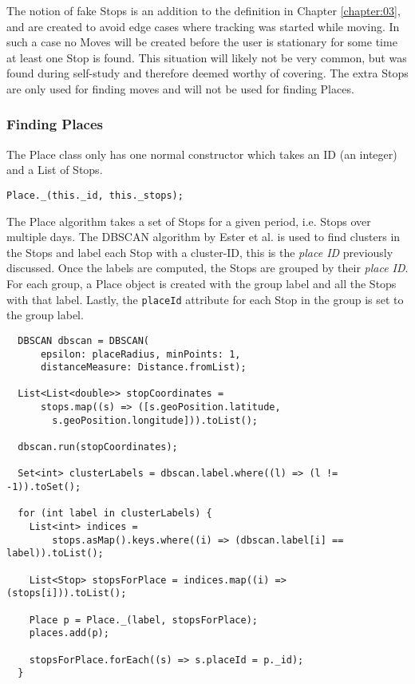 The notion of fake Stops is an addition to the definition in Chapter \ref{chapter:03}, and are created to avoid edge cases where tracking was started while moving. In such a case no Moves will be created before the user is stationary for some time at least one Stop is found. This situation will likely not be very common, but was found during self-study and therefore deemed worthy of covering. The extra Stops are only used for finding moves and will not be used for finding Places.

\subsubsection*{Finding Places}
The Place class only has one normal constructor which takes an ID (an integer) and a List of Stops. 
\begin{verbatim}
Place._(this._id, this._stops);
\end{verbatim}

The Place algorithm takes a set of Stops for a given period, i.e. Stops over multiple days. The DBSCAN algorithm by Ester et al. \cite{density-based-1996} is used to find clusters in the Stops and label each Stop with a cluster-ID, this is the \textit{place ID} previously discussed. Once the labels are computed, the Stops are grouped by their \textit{place ID}. For each group, a Place object is created with the group label and all the Stops with that label. Lastly, the \verb|placeId| attribute for each Stop in the group is set to the group label.

\begin{verbatim}
  DBSCAN dbscan = DBSCAN(
      epsilon: placeRadius, minPoints: 1, 
      distanceMeasure: Distance.fromList);
  
  List<List<double>> stopCoordinates =
      stops.map((s) => ([s.geoPosition.latitude, 
        s.geoPosition.longitude])).toList();

  dbscan.run(stopCoordinates);

  Set<int> clusterLabels = dbscan.label.where((l) => (l != -1)).toSet();

  for (int label in clusterLabels) {
    List<int> indices =
        stops.asMap().keys.where((i) => (dbscan.label[i] == label)).toList();

    List<Stop> stopsForPlace = indices.map((i) => (stops[i])).toList();

    Place p = Place._(label, stopsForPlace);
    places.add(p);

    stopsForPlace.forEach((s) => s.placeId = p._id);
  }
\end{verbatim}


